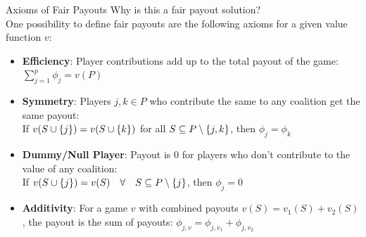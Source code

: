 \documentclass[11pt,compress,t,notes=noshow, aspectratio=169, xcolor=table]{beamer}
\begin{document}
\begin{frame}{Axioms of Fair Payouts}
 Why is this a fair payout solution?
 \\
 One possibility to define fair payouts are the following axioms for a given value function $v$:
  \vspace{0.25cm}
  \begin{itemize}[<+->]
  \itemsep1em
    \item \textbf{Efficiency}: Player contributions add up to the total payout of the game:
      $\sum\nolimits_{j=1}^p\phi_j = v(P)$
    \item \textbf{Symmetry}: Players $j,k \in P$ who contribute the same to any coalition get the same payout: \\
      If $v(\Scupj) = v(\Scupk)$ for all $\SsubP \setminus\{j,k\}$, then $\phi_j=\phi_k$
    \item \textbf{Dummy/Null Player}: Payout is 0 for players who don't contribute to the value of any coalition: \\
      If $v(\Scupj)=v(S)\quad  \forall \quad \SsubP \setminus \{j\}$, then $\phi_j=0$
    \item \textbf{Additivity}: For a game $v$ with combined payouts $v(S) = v_1(S) + v_2(S)$, the payout is the sum of payouts: $\phi_{j,v} = \phi_{j,v_1} + \phi_{j, v_2}$
  \end{itemize}
  \vspace{0.5cm}
  

\end{frame}
\end{document}
